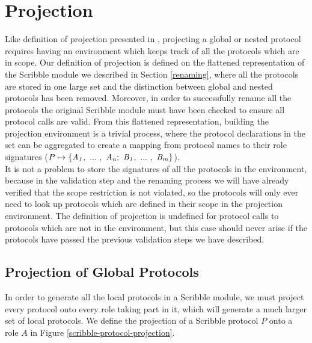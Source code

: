 \documentclass[12pt,twoside]{report}
\begin{document}
\section{Projection}\label{scribble-projection}
Like definition of projection presented in \cite{nestedprotocols}, projecting a global or nested protocol requires having an environment which keeps track of all the protocols which are in scope. Our definition of projection is defined on the flattened representation of the Scribble module we described in Section \ref{renaming}, where all the protocols are stored in one large set and the distinction between global and nested protocols has been removed. Moreover, in order to successfully rename all the protocols the original Scribble module must have been checked to ensure all protocol calls are valid. From this flattened representation, building the projection environment is a trivial process, where the protocol declarations in the set can be aggregated to create a mapping from protocol names to their role signatures ($P \mapsto \{\roles{A}{n};\ \roles{B}{m}\}$).\\

It is not a problem to store the signatures of all the protocols in the environment, because in the validation step and the renaming process we will have already verified that the scope restriction is not violated, so the protocols will only ever need to look up protocols which are defined in their scope in the projection environment. The definition of projection is undefined for protocol calls to protocols which are not in the environment, but this case should never arise if the protocols have passed the previous validation steps we have described.

\subsection{Projection of Global Protocols}

In order to generate all the local protocols in a Scribble module, we must project every protocol onto every role taking part in it, which will generate a much larger set of local protocols. We define the projection of a Scribble protocol $P$ onto a role $A$ in Figure \ref{scribble-protocol-projection}.
\end{document}
